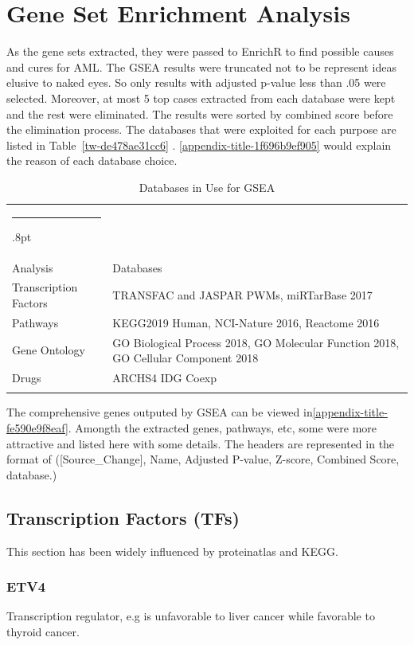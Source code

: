 \documentclass[3p,authoryear,preprint,12pt]{elsarticle}
\makeatletter
\def\hlinewd#1{%
  \noalign{\ifnum0=`}\fi\hrule \@height #1%
  \futurelet\reserved@a\@xhline}
\def\tbltoprule{\hlinewd{.8pt}\\[-12pt]}
\def\tblbottomrule{\noalign{\vspace*{6pt}}\hline\noalign{\vspace*{2pt}}}
\def\tblmidrule{\noalign{\vspace*{6pt}}\hline\noalign{\vspace*{2pt}}}
\makeatother
\begin{document}
    
\section{Gene Set Enrichment Analysis}
As the gene sets extracted, they were passed to EnrichR to find possible causes and cures for AML. The GSEA results were truncated not to be represent ideas elusive to naked eyes. So only results with adjusted p-value less than .05 were selected. Moreover, at most 5 top cases extracted from each database were kept and the rest were eliminated. The results were sorted by combined score before the elimination process. The databases that were exploited for each purpose are listed in Table~\ref{tw-de478ae31cc6} . \ref{appendix-title-1f696b9ef905} would explain the reason of each database choice.


\begin{table}[!htbp]
\caption{{Databases in Use for GSEA} }
\label{tw-de478ae31cd6}
\def\arraystretch{1}
\ignorespaces 
\centering 
\begin{tabulary}{\linewidth}{p{\dimexpr.2732\tabcolsep}p{\dimexpr.7267999999999999\tabcolsep}}
\tbltoprule Analysis & Databases\\
\tblmidrule 
Transcription Factors &
  TRANSFAC and JASPAR PWMs, miRTarBase 2017\\
Pathways &
  KEGG2019 Human, NCI-Nature 2016, Reactome 2016\\
Gene Ontology &
  GO Biological Process 2018, GO Molecular Function 2018, GO Cellular Component 2018\\
Drugs &
  ARCHS4 IDG Coexp\\
\tblbottomrule 
\end{tabulary}\par 
\end{table}
The comprehensive genes outputed by GSEA can be viewed in\ref{appendix-title-fe590e9f8eaf}. Amongth the extracted genes, pathways, etc, some were more attractive and listed here with some details. The headers are represented in the format of ([Source\_Change], Name, Adjusted P-value, Z-score, Combined Score, database.)

\cleardoublepage

\subsection{Transcription Factors (TFs)}This section has been widely influenced by proteinatlas and  KEGG.

\subsubsection{ETV4}Transcription regulator, e.g is unfavorable to liver cancer while favorable to thyroid cancer.
\end{document}
